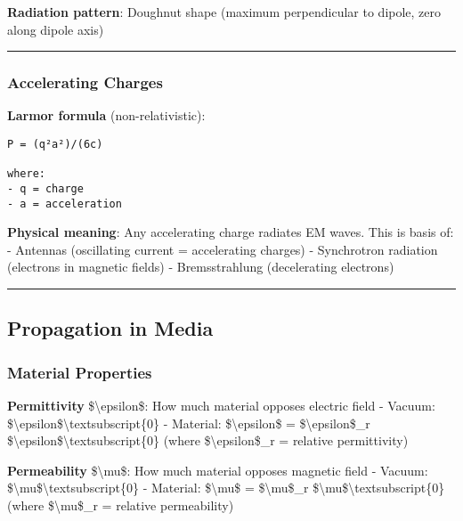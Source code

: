 \textbf{Radiation pattern}: Doughnut shape (maximum perpendicular to
dipole, zero along dipole axis)

\begin{center}\rule{0.5\linewidth}{0.5pt}\end{center}

\subsubsection{Accelerating Charges}\label{accelerating-charges}

\textbf{Larmor formula} (non-relativistic):

\begin{verbatim}
P = (q²a²)/(6c)

where:
- q = charge
- a = acceleration
\end{verbatim}

\textbf{Physical meaning}: Any accelerating charge radiates EM waves.
This is basis of: - Antennas (oscillating current = accelerating
charges) - Synchrotron radiation (electrons in magnetic fields) -
Bremsstrahlung (decelerating electrons)

\begin{center}\rule{0.5\linewidth}{0.5pt}\end{center}

\subsection{\texorpdfstring{ Propagation in
Media}{ Propagation in Media}}\label{propagation-in-media}

\subsubsection{Material Properties}\label{material-properties}

\textbf{Permittivity} \$\textbackslash epsilon\$: How much material
opposes electric field - Vacuum:
\$\textbackslash epsilon\$\textbackslash textsubscript\{0\} - Material:
\$\textbackslash epsilon\$ = \$\textbackslash epsilon\$\_r
\$\textbackslash epsilon\$\textbackslash textsubscript\{0\} (where
\$\textbackslash epsilon\$\_r = relative permittivity)

\textbf{Permeability} \$\textbackslash mu\$: How much material opposes
magnetic field - Vacuum:
\$\textbackslash mu\$\textbackslash textsubscript\{0\} - Material:
\$\textbackslash mu\$ = \$\textbackslash mu\$\_r
\$\textbackslash mu\$\textbackslash textsubscript\{0\} (where
\$\textbackslash mu\$\_r = relative permeability)

